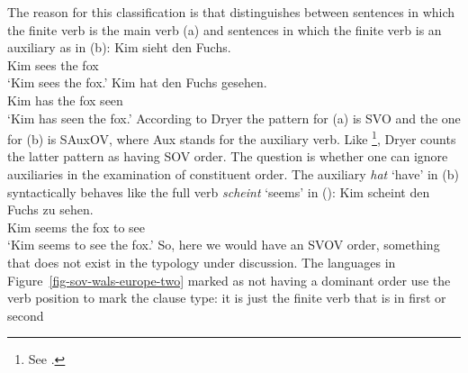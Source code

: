 The reason for this classification is that \citet[Section~1]{Dryer2013c} distinguishes between sentences in which the finite
verb is the main verb (a) and sentences in which the finite verb is an auxiliary as in (b):
\largerpage
\eal
\ex 
\gll Kim sieht den Fuchs.\\
     Kim sees the fox\\
\glt `Kim sees the fox.'
\ex
\gll Kim hat den Fuchs gesehen.\\
     Kim has the fox seen\\
\glt `Kim has seen the fox.'
\zl
According to Dryer the pattern for (a) is SVO and the one for (b) is SAuxOV, where Aux
stands for the auxiliary verb. Like
\citet{Greenberg63a-u}\footnote{%
  See .
}, Dryer counts the latter pattern as having SOV order. The question is whether one can ignore auxiliaries
in the examination of constituent order. The auxiliary \emph{hat} `have' in (b) syntactically
behaves like the full verb \emph{scheint} `seems' in ():
\ea
\gll Kim scheint den Fuchs zu sehen.\\
     Kim seems   the fox  to see\\
\glt `Kim seems to see the fox.'
\z
So, here we would have an SVOV order, something that does not exist in the typology under discussion.
The languages in Figure~\ref{fig-sov-wals-europe-two} marked as not having a dominant order use the
verb position to mark the clause type: it is just the finite verb that is in first or second
